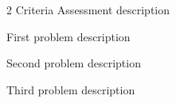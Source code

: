 	\begin{multicols}{2}
		\vspace{-0.25cm}
		Criteria Assessment description
		
		\vspace{0.25cm}
		\vspace{-0.25cm}
		First problem description
		
		\vspace{0.25cm}
		\vspace{-0.25cm}
		Second problem description
		
		\vspace{0.25cm}
		\vspace{-0.25cm}
		Third problem description
	\end{multicols}
	

